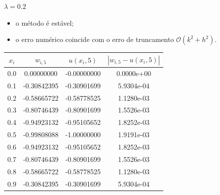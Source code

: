 \documentclass{beamer}
\begin{document}
\begin{frame}{\(\lambda = 0.2\)}
    \begin{itemize}
        \item o método é estável;
        \item o erro numérico coincide com o erro de truncamento \(\mathcal{O}(k^2 + h^2)\).
    \end{itemize}
    \begin{table}[H]
        \centering
        \label{tab:resultados_lambda_0.2}
        \begin{tabular}{cccc}
            \toprule
            \(x_i\) & \(w_{i, 5}\) & \(u(x_i, 5)\) & \(|w_{i, 5} - u(x_i, 5)|\) \\
            \midrule
            0.0 & 0.00000000 & -0.00000000 & 0.0000e+00 \\
            0.1 & -0.30842395 & -0.30901699 & 5.9304e-04 \\
            0.2 & -0.58665722 & -0.58778525 & 1.1280e-03 \\
            0.3 & -0.80746439 & -0.80901699 & 1.5526e-03 \\
            0.4 & -0.94923132 & -0.95105652 & 1.8252e-03 \\
            0.5 & -0.99808088 & -1.00000000 & 1.9191e-03 \\
            0.6 & -0.94923132 & -0.95105652 & 1.8252e-03 \\
            0.7 & -0.80746439 & -0.80901699 & 1.5526e-03 \\
            0.8 & -0.58665722 & -0.58778525 & 1.1280e-03 \\
            0.9 & -0.30842395 & -0.30901699 & 5.9304e-04 \\
            \bottomrule
        \end{tabular}
    \end{table}
\end{frame}
\end{document}

